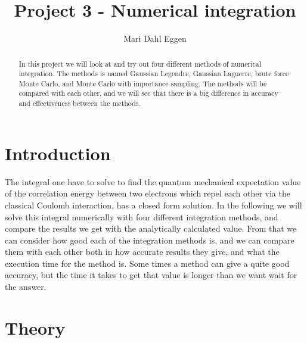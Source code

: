 \documentclass[12pt]{article}
\begin{document}
\title{Project 3 - Numerical integration}
\author{Mari Dahl Eggen}
\maketitle

\newpage

\begin{flushleft}
\begin{abstract}
In this project we will look at and try out four different methods of numerical integration. The methods is named Gaussian Legendre, Gaussian Laguerre, brute force Monte Carlo, and Monte Carlo with importance sampling. The methods will be compared with each other, and we will see that there is a big difference in accuracy and effectiveness between the methods.  
\end{abstract}

\section*{Introduction}
The integral one have to solve to find the quantum mechanical expectation value of the correlation energy between two electrons which repel each other via the classical Coulomb interaction, has a closed form solution. In the following we will solve this integral numerically with four different integration methods, and compare the results we get with the analytically calculated value. From that we can consider how good each of the integration methods is, and we can compare them with each other both in how accurate results they give, and what the execution time for the method is. Some times a method can give a quite good accuracy, but the time it takes to get that value is longer than we want wait for the answer.


\newpage
\section{Theory}

\end{flushleft}
\end{document}
